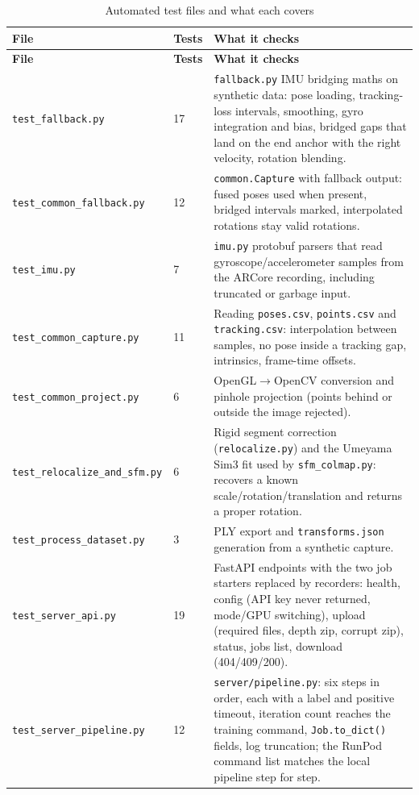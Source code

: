 {\footnotesize\setlength{\tabcolsep}{3pt}
\begin{longtable}{p{}p{}p{}}
\caption{Automated test files and what each covers}\label{tab:testfiles}\\
\toprule
\textbf{File} & \textbf{Tests} & \textbf{What it checks} \\
\midrule
\endfirsthead
\toprule
\textbf{File} & \textbf{Tests} & \textbf{What it checks} \\
\midrule
\endhead
\texttt{test\_fallback.py} & 17 & \texttt{fallback.py} IMU bridging maths on synthetic data: pose loading, tracking-loss intervals, smoothing, gyro integration and bias, bridged gaps that land on the end anchor with the right velocity, rotation blending. \\
\texttt{test\_common\_fallback.py} & 12 & \texttt{common.Capture} with fallback output: fused poses used when present, bridged intervals marked, interpolated rotations stay valid rotations. \\
\texttt{test\_imu.py} & 7 & \texttt{imu.py} protobuf parsers that read gyroscope/accelerometer samples from the ARCore recording, including truncated or garbage input. \\
\texttt{test\_common\_capture.py} & 11 & Reading \texttt{poses.csv}, \texttt{points.csv} and \texttt{tracking.csv}: interpolation between samples, no pose inside a tracking gap, intrinsics, frame-time offsets. \\
\texttt{test\_common\_project.py} & 6 & OpenGL$\rightarrow$OpenCV conversion and pinhole projection (points behind or outside the image rejected). \\
\texttt{test\_relocalize\_and\_sfm.py} & 6 & Rigid segment correction (\texttt{relocalize.py}) and the Umeyama Sim3 fit used by \texttt{sfm\_colmap.py}: recovers a known scale/rotation/translation and returns a proper rotation. \\
\texttt{test\_process\_dataset.py} & 3 & PLY export and \texttt{transforms.json} generation from a synthetic capture. \\
\texttt{test\_server\_api.py} & 19 & FastAPI endpoints with the two job starters replaced by recorders: health, config (API key never returned, mode/GPU switching), upload (required files, depth zip, corrupt zip), status, jobs list, download (404/409/200). \\
\texttt{test\_server\_pipeline.py} & 12 & \texttt{server/pipeline.py}: six steps in order, each with a label and positive timeout, iteration count reaches the training command, \texttt{Job.to\_dict()} fields, log truncation; the RunPod command list matches the local pipeline step for step. \\

\end{longtable}}
